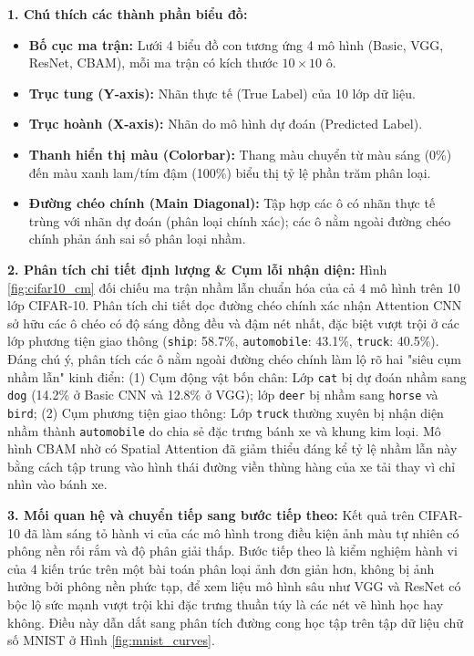 \documentclass[12pt,a4paper]{article}
\begin{document}
\begin{chartbox}[title={Chú thích \& Phân tích chuyên sâu Ma trận nhầm lẫn CIFAR-10 (Hình \ref{fig:cifar10_cm})}]
\textbf{\color{blue!80!black}1. Chú thích các thành phần biểu đồ:}
\begin{itemize}[noitemsep,topsep=1pt,leftmargin=15pt]
    \item \textbf{Bố cục ma trận:} Lưới 4 biểu đồ con tương ứng 4 mô hình (Basic, VGG, ResNet, CBAM), mỗi ma trận có kích thước $10 \times 10$ ô.
    \item \textbf{Trục tung (Y-axis):} Nhãn thực tế (True Label) của 10 lớp dữ liệu.
    \item \textbf{Trục hoành (X-axis):} Nhãn do mô hình dự đoán (Predicted Label).
    \item \textbf{Thanh hiển thị màu (Colorbar):} Thang màu chuyển từ màu sáng (0\%) đến màu xanh lam/tím đậm (100\%) biểu thị tỷ lệ phần trăm phân loại.
    \item \textbf{Đường chéo chính (Main Diagonal):} Tập hợp các ô có nhãn thực tế trùng với nhãn dự đoán (phân loại chính xác); các ô nằm ngoài đường chéo chính phản ánh sai số phân loại nhầm.
\end{itemize}

\vspace{1mm}
\textbf{\color{blue!80!black}2. Phân tích chi tiết định lượng \& Cụm lỗi nhận diện:}
Hình \ref{fig:cifar10_cm} đối chiếu ma trận nhầm lẫn chuẩn hóa của cả 4 mô hình trên 10 lớp CIFAR-10. Phân tích chi tiết dọc đường chéo chính xác nhận Attention CNN sở hữu các ô chéo có độ sáng đồng đều và đậm nét nhất, đặc biệt vượt trội ở các lớp phương tiện giao thông (\texttt{ship}: 58.7\%, \texttt{automobile}: 43.1\%, \texttt{truck}: 40.5\%). Đáng chú ý, phân tích các ô nằm ngoài đường chéo chính làm lộ rõ hai "siêu cụm nhầm lẫn" kinh điển:
(1) Cụm động vật bốn chân: Lớp \texttt{cat} bị dự đoán nhầm sang \texttt{dog} (14.2\% ở Basic CNN và 12.8\% ở VGG); lớp \texttt{deer} bị nhầm sang \texttt{horse} và \texttt{bird};
(2) Cụm phương tiện giao thông: Lớp \texttt{truck} thường xuyên bị nhận diện nhầm thành \texttt{automobile} do chia sẻ đặc trưng bánh xe và khung kim loại. Mô hình CBAM nhờ có Spatial Attention đã giảm thiểu đáng kể tỷ lệ nhầm lẫn này bằng cách tập trung vào hình thái đường viền thùng hàng của xe tải thay vì chỉ nhìn vào bánh xe.

\vspace{1mm}
\textbf{\color{blue!80!black}3. Mối quan hệ và chuyển tiếp sang bước tiếp theo:}
Kết quả trên CIFAR-10 đã làm sáng tỏ hành vi của các mô hình trong điều kiện ảnh màu tự nhiên có phông nền rối rắm và độ phân giải thấp. Bước tiếp theo là kiểm nghiệm hành vi của 4 kiến trúc trên một bài toán phân loại ảnh đơn giản hơn, không bị ảnh hưởng bởi phông nền phức tạp, để xem liệu mô hình sâu như VGG và ResNet có bộc lộ sức mạnh vượt trội khi đặc trưng thuần túy là các nét vẽ hình học hay không. Điều này dẫn dắt sang phân tích đường cong học tập trên tập dữ liệu chữ số MNIST ở Hình \ref{fig:mnist_curves}.
\end{chartbox}
\end{document}
